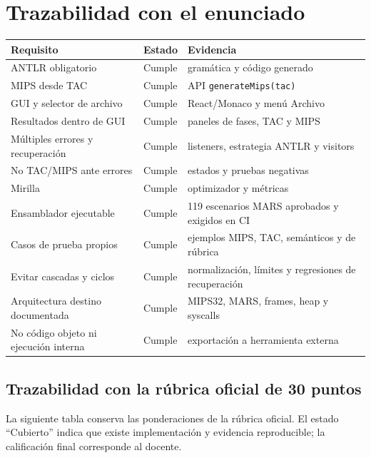 \documentclass[11pt,letterpaper,oneside]{report}
\newcommand{\codigo}[1]{\texttt{#1}}
\begin{document}
\chapter{Trazabilidad con el enunciado}

\begin{longtable}{p{6cm}p{2.4cm}p{5cm}}
\toprule
Requisito & Estado & Evidencia\\\midrule
\endhead
ANTLR obligatorio & Cumple & gram\'atica y c\'odigo generado\\
MIPS desde TAC & Cumple & API \codigo{generateMips(tac)}\\
GUI y selector de archivo & Cumple & React/Monaco y men\'u Archivo\\
Resultados dentro de GUI & Cumple & paneles de fases, TAC y MIPS\\
M\'ultiples errores y recuperaci\'on & Cumple & listeners, estrategia ANTLR y visitors\\
No TAC/MIPS ante errores & Cumple & estados y pruebas negativas\\
Mirilla & Cumple & optimizador y m\'etricas\\
Ensamblador ejecutable & Cumple & 119 escenarios MARS aprobados y exigidos en CI\\
Casos de prueba propios & Cumple & ejemplos MIPS, TAC, sem\'anticos y de r\'ubrica\\
Evitar cascadas y ciclos & Cumple & normalizaci\'on, l\'imites y regresiones de recuperaci\'on\\
Arquitectura destino documentada & Cumple & MIPS32, MARS, frames, heap y syscalls\\
No c\'odigo objeto ni ejecuci\'on interna & Cumple & exportaci\'on a herramienta externa\\
\bottomrule
\end{longtable}

\section{Trazabilidad con la r\'ubrica oficial de 30 puntos}

La siguiente tabla conserva las ponderaciones de la r\'ubrica oficial. El estado ``Cubierto'' indica que existe implementaci\'on y evidencia reproducible; la calificaci\'on final corresponde al docente.
\end{document}
